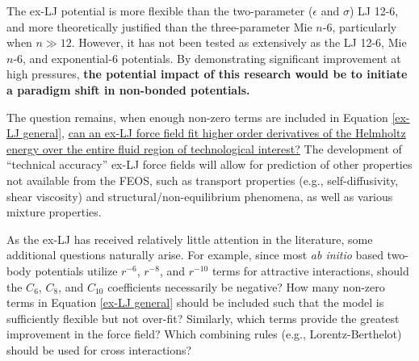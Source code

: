\documentclass[12pt,a4paper]{article}
\begin{document}


The ex-LJ potential is more flexible than the two-parameter ($\epsilon$ and $\sigma$) LJ 12-6, and more theoretically justified than the three-parameter Mie $n$-6, particularly when $n \gg 12$. However, it has not been tested as extensively as the LJ 12-6, Mie $n$-6, and exponential-6 potentials. By demonstrating significant improvement at high pressures, \textbf{the potential impact of this research would be to initiate a paradigm shift in non-bonded potentials.}

The question remains, when enough non-zero terms are included in Equation \ref{ex-LJ general}, \ul{can an ex-LJ force field fit higher order derivatives of the Helmholtz energy over the entire fluid region of technological interest?} The development of ``technical accuracy'' ex-LJ force fields will allow for prediction of other properties not available from the FEOS, such as transport properties (e.g., self-diffusivity, shear viscosity) and structural/non-equilibrium phenomena, as well as various mixture properties.



As the ex-LJ has received relatively little attention in the literature, some additional questions naturally arise. For example, since most \textit{ab initio} based two-body potentials utilize $r^{-6}$, $r^{-8}$, and $r^{-10}$ terms for attractive interactions, should the $C_6$, $C_8$, and $C_{10}$ coefficients necessarily be negative? How many non-zero terms in Equation \ref{ex-LJ general} should be included such that the model is sufficiently flexible but not over-fit? Similarly, which terms provide the greatest improvement in the force field? Which combining rules (e.g., Lorentz-Berthelot) should be used for cross interactions?
\end{document}
